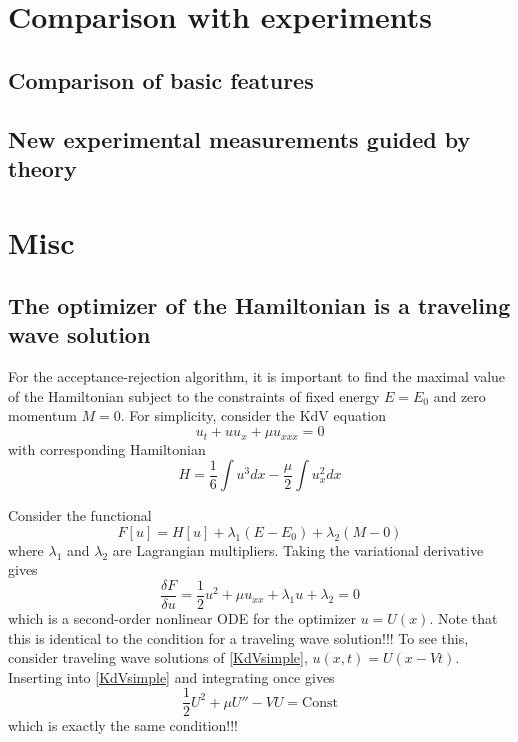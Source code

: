 \documentclass[11pt]{article}
\newcommand{\np}{\newpage \noindent}
\begin{document}
\section{Comparison with experiments}

\subsection{Comparison of basic features}

\subsection{New experimental measurements guided by theory}

\np
\section{Misc}
\subsection{The optimizer of the Hamiltonian is a traveling wave solution}
For the acceptance-rejection algorithm, it is important to find the maximal value of the Hamiltonian subject to the constraints of fixed energy $E = E_0$ and zero momentum $M = 0$. For simplicity, consider the KdV equation
\begin{equation}
\label{KdVsimple}
u_t + u u_x + \mu u_{xxx} = 0
\end{equation}
with corresponding Hamiltonian
\begin{equation}
H = \frac{1}{6} \int u^3 dx - \frac{\mu}{2} \int u_x^2 dx
\end{equation}

Consider the functional
\begin{equation}
F[u] = H[u] + \lambda_1 (E-E_0) + \lambda_2 (M-0)
\end{equation}
where $\lambda_1$ and $\lambda_2$ are Lagrangian multipliers. Taking the variational derivative gives
\begin{equation}
\frac{\delta F}{\delta u} = \frac{1}{2} u^2 + \mu u_{xx} + \lambda_1 u + \lambda_2 = 0
\end{equation}
which is a second-order nonlinear ODE for the optimizer $u = U(x)$. Note that this is identical to the condition for a traveling wave solution!!! To see this, consider traveling wave solutions of \ref{KdVsimple}, $u(x,t) = U(x-Vt)$. Inserting into \ref{KdVsimple} and integrating once gives
\begin{equation}
\frac{1}{2} U^2 + \mu U'' - V U = \text{Const}
\end{equation}
which is exactly the same condition!!!

%
%
\end{document}
